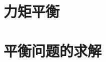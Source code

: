 \documentclass[color=purple,openany]{textbook-cn}
\begin{document}
\begin{Point}
\lipsum[2]
\end{Point}

\begin{Case}
\item \lipsum[1][3]
\item \lipsum[1][3]
\item \lipsum[1][3]
\item \lipsum[1][3]
\end{Case}

\begin{Link}
\zhlipsum[1]
\end{Link}



\section{力矩平衡}

\begin{Point}
\lipsum[2]
\end{Point}

\begin{Case}
\item \lipsum[1][3]
\item \lipsum[1][3]
\item \lipsum[1][3]
\item \lipsum[1][3]
\end{Case}

\begin{Link}
\zhlipsum[1]
\end{Link}



\section{平衡问题的求解}

\begin{Point}
\lipsum[2]
\end{Point}

\begin{Case}
\item \lipsum[1][3]
\item \lipsum[1][3]
\item \lipsum[1][3]
\item \lipsum[1][3]
\end{Case}

\begin{Link}
\zhlipsum[1]
\end{Link}
\end{document}
